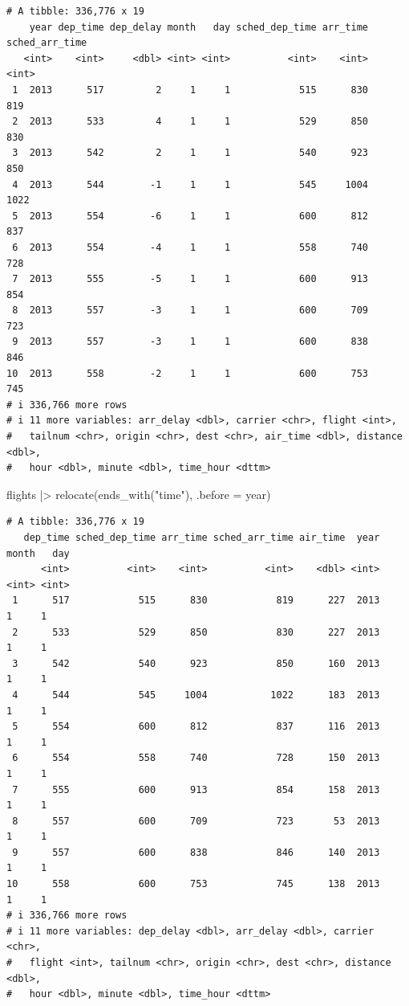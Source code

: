 \documentclass[
  letterpaper,
  DIV=11,
  numbers=noendperiod]{scrreprt}
\newenvironment{Shaded}{\begin{snugshade}}{\end{snugshade}}
\newcommand{\AttributeTok}[1]{\textcolor[rgb]{0.40,0.45,0.13}{#1}}
\newcommand{\FunctionTok}[1]{\textcolor[rgb]{0.28,0.35,0.67}{#1}}
\newcommand{\NormalTok}[1]{\textcolor[rgb]{0.00,0.23,0.31}{#1}}
\newcommand{\SpecialCharTok}[1]{\textcolor[rgb]{0.37,0.37,0.37}{#1}}
\newcommand{\StringTok}[1]{\textcolor[rgb]{0.13,0.47,0.30}{#1}}
\begin{document}
\begin{verbatim}
# A tibble: 336,776 x 19
    year dep_time dep_delay month   day sched_dep_time arr_time sched_arr_time
   <int>    <int>     <dbl> <int> <int>          <int>    <int>          <int>
 1  2013      517         2     1     1            515      830            819
 2  2013      533         4     1     1            529      850            830
 3  2013      542         2     1     1            540      923            850
 4  2013      544        -1     1     1            545     1004           1022
 5  2013      554        -6     1     1            600      812            837
 6  2013      554        -4     1     1            558      740            728
 7  2013      555        -5     1     1            600      913            854
 8  2013      557        -3     1     1            600      709            723
 9  2013      557        -3     1     1            600      838            846
10  2013      558        -2     1     1            600      753            745
# i 336,766 more rows
# i 11 more variables: arr_delay <dbl>, carrier <chr>, flight <int>,
#   tailnum <chr>, origin <chr>, dest <chr>, air_time <dbl>, distance <dbl>,
#   hour <dbl>, minute <dbl>, time_hour <dttm>
\end{verbatim}

\begin{Shaded}
\begin{Highlighting}[]
\NormalTok{flights }\SpecialCharTok{|\textgreater{}}
  \FunctionTok{relocate}\NormalTok{(}\FunctionTok{ends\_with}\NormalTok{(}\StringTok{"time"}\NormalTok{), }\AttributeTok{.before =}\NormalTok{ year)}
\end{Highlighting}
\end{Shaded}

\begin{verbatim}
# A tibble: 336,776 x 19
   dep_time sched_dep_time arr_time sched_arr_time air_time  year month   day
      <int>          <int>    <int>          <int>    <dbl> <int> <int> <int>
 1      517            515      830            819      227  2013     1     1
 2      533            529      850            830      227  2013     1     1
 3      542            540      923            850      160  2013     1     1
 4      544            545     1004           1022      183  2013     1     1
 5      554            600      812            837      116  2013     1     1
 6      554            558      740            728      150  2013     1     1
 7      555            600      913            854      158  2013     1     1
 8      557            600      709            723       53  2013     1     1
 9      557            600      838            846      140  2013     1     1
10      558            600      753            745      138  2013     1     1
# i 336,766 more rows
# i 11 more variables: dep_delay <dbl>, arr_delay <dbl>, carrier <chr>,
#   flight <int>, tailnum <chr>, origin <chr>, dest <chr>, distance <dbl>,
#   hour <dbl>, minute <dbl>, time_hour <dttm>
\end{verbatim}
\end{document}
